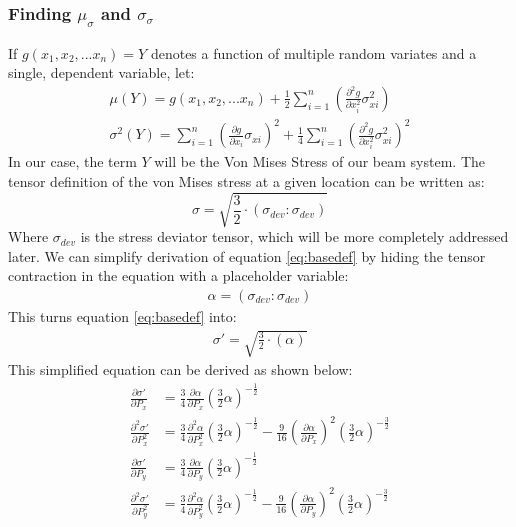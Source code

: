 \subsubsection{Finding $\mu_\sigma$ and $\sigma_\sigma$}
If $g(x_1, x_2, ... x_n) = Y$ denotes a function of multiple random variates and a single, dependent variable, let: 
   \begin{align}
	   \mu(Y) = g(x_1, x_2, ... x_n) + \frac{1}{2} \sum_{i=1}^{n}\left( \frac{\partial^2 g}{\partial x_i^2} \sigma_{xi}^2  \right)
	            \label{eq:mu}\\
	   \sigma^2(Y) = \sum_{i=1}^{n}\left( \frac{\partial g}{\partial x_i} \sigma_{xi}  \right)^2 + 
			 \frac{1}{4} \sum_{i=1}^{n}\left( \frac{\partial^2 g}{\partial x_i^2} \sigma_{xi}^2  \right)^2 \label{eq:sigma}
   \end{align}
In our case, the term $Y$ will be the Von Mises Stress of our beam system. The tensor definition of the von Mises stress at a given location can be written as:
   \begin{equation}
      \sigma = \sqrt{\frac{3}{2} \cdot \left(\sigma_{dev}:\sigma_{dev} \right)}
	\label{eq:basedef}
   \end{equation}
Where $\sigma_{dev}$ is the stress deviator tensor, which will be more completely addressed later. 
We can simplify derivation of equation \ref{eq:basedef} by hiding the tensor contraction in the equation with a placeholder variable:
   \begin{align}
	   \alpha = (\sigma_{dev}:\sigma_{dev})
	   \label{eq:defalpha}
   \end{align}
This turns equation \ref{eq:basedef} into:
   \begin{align}
      \sigma' = \sqrt{\frac{3}{2} \cdot \left(\alpha\right)}
   \end{align}
This simplified equation can be derived as shown below: 
   \begin{align}
	   \frac{\partial \sigma'}{\partial P_x} &= \frac{3}{4} \frac{\partial \alpha}{\partial P_x} 
						    \left( \frac{3}{2} \alpha \right)^{-\frac{1}{2}}\label{eq:fd_vmx}\\
	   \frac{\partial^2 \sigma'}{\partial P_x^2} &= \frac{3}{4} \frac{\partial ^2 \alpha}{\partial P_x^2}
	                                                \left( \frac{3}{2} \alpha \right)^{-\frac{1}{2}} - 
							\frac{9}{16} \left(\frac{\partial \alpha}{\partial P_x}\right)^2
							\left( \frac{3}{2} \alpha \right)^{-\frac{3}{2}}\\
	   \frac{\partial \sigma'}{\partial P_y} &= \frac{3}{4} \frac{\partial \alpha}{\partial P_y} 
	                                            \left( \frac{3}{2} \alpha \right)^{-\frac{1}{2}}\\
	   \frac{\partial^2 \sigma'}{\partial P_y^2} &= \frac{3}{4} \frac{\partial ^2 \alpha}{\partial P_y^2}
	                                                \left( \frac{3}{2} \alpha \right)^{-\frac{1}{2}} - 
							\frac{9}{16} \left(\frac{\partial \alpha}{\partial P_y}\right)^2
							\left( \frac{3}{2} \alpha \right)^{-\frac{3}{2}}\label{eq:sd_vmy}
   \end{align}
